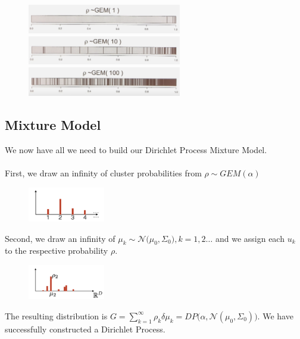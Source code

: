 \documentclass[twoside]{article}
\begin{document}
\begin{figure}[h]
\centering
\includegraphics[width=0.6\textwidth]{img/gem1.png}
\includegraphics[width=0.6\textwidth]{img/gem10.png}
\includegraphics[width=0.6\textwidth]{img/gem100.png}
\end{figure}
\newpage
\subsection{Mixture Model}
We now have all we need to build our Dirichlet Process Mixture Model. \\ \\
First, we draw an infinity of cluster probabilities from $\rho \sim GEM(\alpha)$

\begin{figure}[h]
    \centering
    \includegraphics[width=0.3\textwidth]{img/frequencies.png}
\end{figure}

Second, we draw an infinity of $\mu_{k} \sim \mathcal{N}\Big(\mu_{0}, \Sigma_{0}\Big), k=1,2 \ldots$  and we assign each $u_{k}$ to the respective probability $\rho$.

\begin{figure}[h]
    \centering
    \includegraphics[width=0.3\textwidth]{img/us.png}
\end{figure}

The resulting distribution is $G= \sum_{k=1}^{\infty} \rho_{k} \delta{\mu_{k}} = DP\Big(\alpha, \mathcal{N}(\mu_{0}, \Sigma_{0})\Big)$. We have successfully constructed a Dirichlet Process. 
\end{document}
